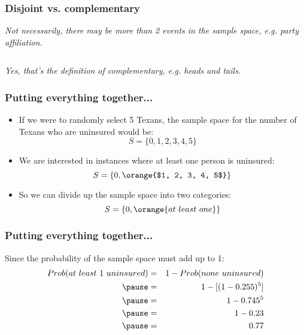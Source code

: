 \documentclass[slidestop,compress,mathserif]{beamer}
\newcommand{\soln}[1]{\textit{#1}}
\begin{document}

\begin{frame}
\frametitle{Disjoint vs. complementary}


\pause

\soln{Not necessarily, there may be more than 2 events in the sample space, e.g. party affiliation.}

\pause
$\:$ \\


\pause

\soln{Yes, that's the definition of complementary, e.g. heads and tails. }

\end{frame}


\begin{frame}
\frametitle{Putting everything together...}


\begin{itemize}

\item If we were to randomly select 5 Texans, the sample space for the number of Texans who are uninsured would be:
\[ S = \{0, 1, 2, 3, 4, 5\} \]

\item We are interested in instances where at least one person is uninsured:
\[ S = \{0, \orange{$1, 2, 3, 4, 5$} \} \]

\item So we can divide up the sample space into two categories:
\[ S = \{0, \orange{at~least~one} \} \]

\end{itemize}

\end{frame}


\begin{frame}
\frametitle{Putting everything together...}

Since the probability of the sample space must add up to 1:
\begin{eqnarray*}
Prob(at~least~1~uninsured) &=& 1 - Prob(none~uninsured) \\
\pause
&=& 1 - [(1-0.255)^5] \\
\pause
&=& 1- 0.745^5 \\
\pause
&=& 1 - 0.23 \\
\pause
&=& 0.77
\end{eqnarray*}

$\:$ \\
$\:$ \\


\end{frame}
\end{document}
